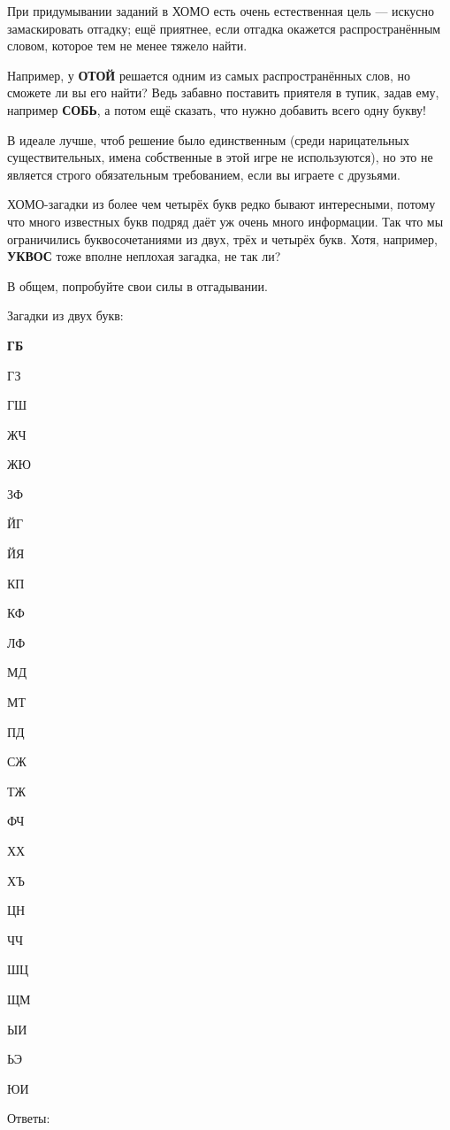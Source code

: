 При придумывании заданий в ХОМО есть очень естественная цель --- искусно замаскировать отгадку;
ещё приятнее, если отгадка окажется распространённым словом, которое тем не менее тяжело найти. 

Например, у \textbf{ОТОЙ} решается одним из самых распространённых слов, но сможете ли вы его найти?
Ведь забавно поставить приятеля в тупик, задав ему, например \textbf{СОБЬ}, а потом ещё сказать, что нужно добавить всего одну букву! 

В идеале лучше, чтоб решение было единственным (среди нарицательных существительных, имена собственные в этой игре не используются), но это не является строго обязательным требованием, если вы играете с друзьями.

ХОМО-загадки из более чем четырёх букв редко бывают интересными, потому что много известных букв подряд даёт уж очень много информации.
Так что мы ограничились буквосочетаниями из двух, трёх и четырёх букв.
Хотя, например, \textbf{УКВОС} тоже вполне неплохая загадка, не так ли?

В общем, попробуйте свои силы в отгадывании.

Загадки из двух букв:

\begin{multicols}{4}
{\bf
ГБ

ГЗ

ГШ

ЖЧ

ЖЮ

ЗФ

ЙГ

ЙЯ

КП

КФ

ЛФ

МД

МТ

ПД

СЖ

ТЖ

ФЧ

ХХ

ХЪ

ЦН

ЧЧ

ШЦ

ЩМ

ЫИ

ЬЭ

ЮИ
}
\end{multicols}

Ответы:

